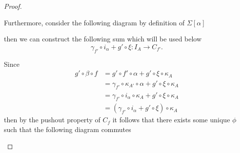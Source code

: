 \begin{proof}
\begin{enumerate}[label={(\bfseries TR\arabic*)}]
{            %
            Furthermore, consider the following diagram by definition of \( \Sigma [\alpha] \)
            \begin{center}
            \end{center}
            then we can construct the following sum which will be used below
            \[
                \gamma_{f'} \circ i_{\alpha} + g' \circ \xi: I_A \to C_{f'}.
            \]

            Since
            \begin{align*}
                g' \circ \beta \circ f &= g' \circ f' \circ \alpha + g' \circ \xi \circ \kappa_A \\
                &= \gamma_{f'} \circ \kappa_{A'} \circ \alpha + g' \circ \xi \circ \kappa_A \\
                &= \gamma_{f'} \circ i_{\alpha} \circ \kappa_A + g' \circ \xi \circ \kappa_A \\
                &= (\gamma_{f'} \circ i_{\alpha} + g' \circ \xi) \circ \kappa_A
            \end{align*}
            then by the pushout property of \( C_f \) it follows that there exists some unique \( \phi \) such that the following diagram commutes
            \begin{center}
\end{center}}
\end{enumerate}
\end{proof}

